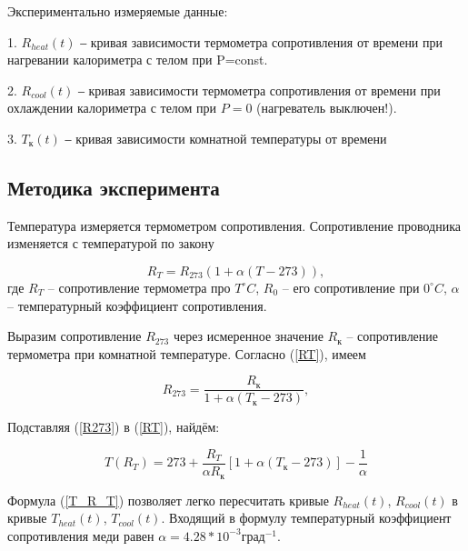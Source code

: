 \documentclass[a4paper, 12pt]{article}
\begin{document}
            Экспериментально измеряемые данные:

                1. $R_{heat}(t)$ ‒ кривая зависимости термометра сопротивления от времени при нагревании калориметра с телом при P=const.

                2. $R_{cool}(t)$ ‒ кривая зависимости термометра сопротивления от времени при охлаждении калориметра с телом при $P = 0$ (нагреватель выключен!).

                3. $T_к(t)$ ‒ кривая зависимости комнатной температуры от времени

        \subsection{Методика эксперимента}

            Температура измеряется термометром сопротивления. Сопротивление проводника изменяется с температурой по закону

            \begin{equation}
                R_{T} = R_{273}(1 + \alpha (T - 273)),
                \label{RT}
            \end{equation}
            где $R_{T}$ -- сопротивление термометра про $T  ^{\circ}C$, $R_{0}$ -- его сопротивление при $0  ^{\circ}C$, $\alpha$ -- температурный коэффициент сопротивления.

            Выразим сопротивление $R_{273}$ через исмеренное значение $R_{к}$ -- сопротивление термометра при комнатной температуре. Согласно (\ref{RT}), имеем

            \begin{equation}
                R_{273} = \frac{R_{к}}{1 + \alpha (T_к - 273)},
                \label{R273}
            \end{equation}

            Подставляя (\ref{R273}) в (\ref{RT}), найдём:

            \begin{equation}
                T(R_T) = 273 + \frac{R_T}{\alpha R_к} \left[ 1 + \alpha (T_к - 273) \right] - \frac{1}{\alpha}
                \label{T_R_T}
            \end{equation}

            Формула (\ref{T_R_T}) позволяет легко пересчитать кривые $R_{heat}(t)$, $R_{cool}(t)$ в кривые $T_{heat}(t)$, $T_{cool}(t)$. Входящий в формулу температурный коэффициент сопротивления меди равен $\alpha = 4.28*10^{-3} град^{-1}$.
\end{document}
